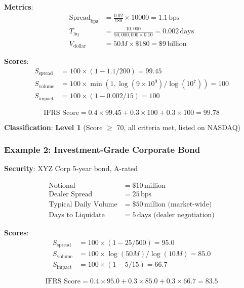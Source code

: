 \documentclass[11pt,a4paper]{article}
\begin{document}
\textbf{Metrics}:
\begin{align*}
\text{Spread}_{\text{bps}} &= \frac{0.02}{180} \times 10000 = 1.1\,\text{bps} \\
T_{\text{liq}} &= \frac{10,000}{50,000,000 \times 0.10} = 0.002\,\text{days} \\
V_{\text{dollar}} &= 50M \times \$180 = \$9\,\text{billion}
\end{align*}

\textbf{Scores}:
\begin{align*}
S_{\text{spread}} &= 100 \times (1 - 1.1/200) = 99.45 \\
S_{\text{volume}} &= 100 \times \min(1, \log(9 \times 10^9) / \log(10^7)) = 100 \\
S_{\text{impact}} &= 100 \times (1 - 0.002/15) = 100
\end{align*}

\begin{equation}
\text{IFRS Score} = 0.4 \times 99.45 + 0.3 \times 100 + 0.3 \times 100 = 99.78
\end{equation}

\textbf{Classification}: \textbf{Level 1} (Score $\geq$ 70, all criteria met, listed on NASDAQ)

\subsubsection{Example 2: Investment-Grade Corporate Bond}

\textbf{Security}: XYZ Corp 5-year bond, A-rated

\begin{align*}
\text{Notional} &= \$10\,\text{million} \\
\text{Dealer Spread} &= 25\,\text{bps} \\
\text{Typical Daily Volume} &= \$50\,\text{million (market-wide)} \\
\text{Days to Liquidate} &= 5\,\text{days (dealer negotiation)}
\end{align*}

\textbf{Scores}:
\begin{align*}
S_{\text{spread}} &= 100 \times (1 - 25/500) = 95.0 \\
S_{\text{volume}} &= 100 \times \log(50M) / \log(10M) = 85.0 \\
S_{\text{impact}} &= 100 \times (1 - 5/15) = 66.7
\end{align*}

\begin{equation}
\text{IFRS Score} = 0.4 \times 95.0 + 0.3 \times 85.0 + 0.3 \times 66.7 = 83.5
\end{equation}
\end{document}

